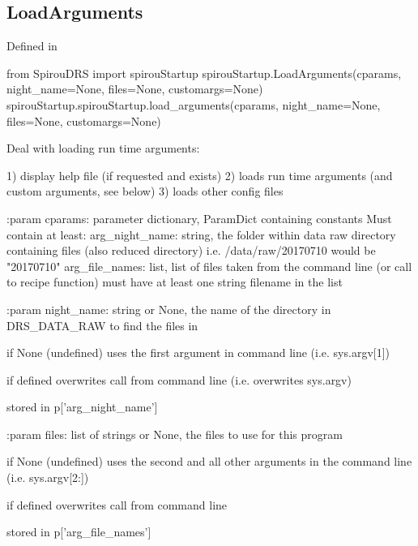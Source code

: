 \begin{minipage}{\textwidth}
\subsection{LoadArguments}

Defined in \spirouStartup{}

\begin{pythonbox}
from SpirouDRS import spirouStartup
spirouStartup.LoadArguments(cparams, night_name=None, files=None, customargs=None)
spirouStartup.spirouStartup.load_arguments(cparams, night_name=None, files=None, customargs=None)
\end{pythonbox}

\begin{pythondocstring}
Deal with loading run time arguments:

1) display help file (if requested and exists)
2) loads run time arguments (and custom arguments, see below)
3) loads other config files

:param cparams: parameter dictionary, ParamDict containing constants
    Must contain at least:
            arg_night_name: string, the folder within data raw directory
                            containing files (also reduced directory) i.e.
                            /data/raw/20170710 would be "20170710"
            arg_file_names: list, list of files taken from the command line
                            (or call to recipe function) must have at least
                            one string filename in the list

:param night_name: string or None, the name of the directory in DRS_DATA_RAW
                   to find the files in

                   if None (undefined) uses the first argument in command
                   line (i.e. sys.argv[1])

                   if defined overwrites call from
                   command line (i.e. overwrites sys.argv)

                   stored in p['arg_night_name']

:param files: list of strings or None, the files to use for this program

              if None (undefined) uses the second and all other arguments in
              the command line (i.e. sys.argv[2:])

              if defined overwrites call from command line

              stored in p['arg_file_names']


\end{pythondocstring}
\end{minipage}
